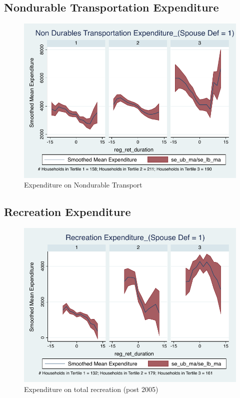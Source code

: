 \documentclass[a4paper]{article}
\begin{document}
\subsection{Nondurable Transportation Expenditure}
\begin{table}[h]
	\centering
	
\end{table}

\begin{figure}[h]
	\caption{Expenditure on Nondurable Transport}
	\centering
	\includegraphics[width=1.0\textwidth]{../ConsumptionPostRetirement_by_SpouseDef_Cats/Smoothed/1/spouse_def_total_transport_real.pdf}
\end{figure}
\clearpage

\subsection{Recreation Expenditure}
\begin{table}[h]
	\centering
	
\end{table}

\begin{figure}[h]
	\caption{Expenditure on total recreation (post 2005)}
	\centering
	\includegraphics[width=1.0\textwidth]{../ConsumptionPostRetirement_by_SpouseDef_Cats/Smoothed/1/spouse_def_total_recreation_2005_real.pdf}
\end{figure}
\end{document}
